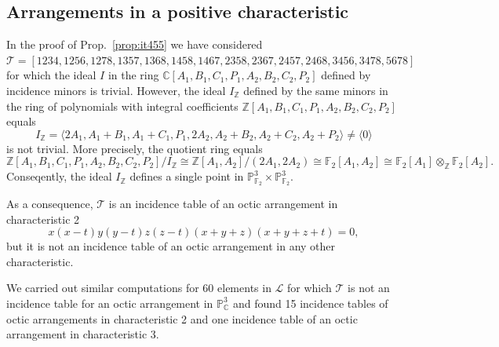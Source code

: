 \documentclass[12pt]{amsart}
\theoremstyle{plain}
\theoremstyle{remark}
\theoremstyle{definition}
\newcommand{\PP}{\mathbb P}
\newcommand\CC{{\mathbb C}}
\newcommand\ZZ{{\mathbb Z}}
\numberwithin{table}{section}
\begin{document}
\subsection*{Arrangements in a positive characteristic}
In the proof of Prop.~\ref{prop:it455} we have considered
$\mathcal T=	[1234, 1256, 1278, 1357, 1368, 1458, 1467, 2358, 2367, 2457, 2468, 3456, 3478, 5678]$ for which the ideal $I$ in the ring $\mathbb C[A_{1},B_{1},C_{1},P_{1},A_{2},B_{2},C_{2},P_{2}]$ defined by incidence minors
is trivial. However, the ideal $I_{\ZZ}$ defined by the same minors in the ring
of polynomials with integral coefficients
$\ZZ[A_{1},B_{1},C_{1},P_{1},A_{2},B_{2},C_{2},P_{2}]$ equals
\[I_{\ZZ}=\langle2A_{1},A_{1}+B_{1},A_{1}+C_{1},P_{1},2A_{2},A_{2}+B_{2},A_{2}+C_{2},A_{2}+P_{2}\rangle \not= \langle0\rangle\]
is not trivial. More precisely, the quotient ring equals
\[\ZZ[A_{1},B_{1},C_{1},P_{1},A_{2},B_{2},C_{2},P_{2}]/I_{\ZZ}\cong\ZZ[A_{1},A_{2}]/(2A_{1},2A_{2})\cong \mathbb F_{2}[A_{1},A_{2}]\cong \mathbb F_{2}[A_{1}]\otimes_{\ZZ}\mathbb F_{2}[A_{2}].\]
Conseqently, the ideal $I_{\ZZ}$ defines a single point in $\PP_{\mathbb F_{2}}^{3}\times\PP_{\mathbb F_{2}}^{3}$.

As a consequence, $\mathcal T$ is an incidence table of an octic arrangement in characteristic 2
\[x(x-t)y(y-t)z(z-t)(x+y+z)(x+y+z+t)=0,\]
but it is not an incidence table of an octic arrangement in any other characteristic.

We carried out similar computations for 60 elements in $\mathcal L$ for which $\mathcal T$ is not an incidence table for an octic arrangement in $\PP_{\CC}^{3}$ and found 15 incidence tables of octic arrangements in characteristic 2 and one incidence table of an octic arrangement in characteristic 3.
\end{document}
